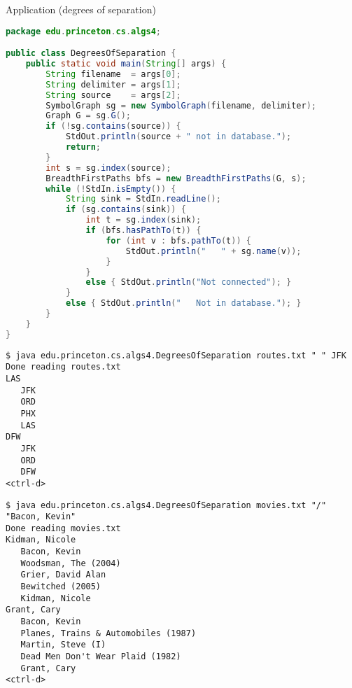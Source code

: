 \documentclass[8pt,a4paper,compress]{beamer}
\begin{document}
\begin{frame}[fragile]
\pause

Application (degrees of separation)
\begin{lstlisting}[language=Java]
package edu.princeton.cs.algs4;

public class DegreesOfSeparation {
    public static void main(String[] args) {
        String filename  = args[0];
        String delimiter = args[1];
        String source    = args[2];
        SymbolGraph sg = new SymbolGraph(filename, delimiter);
        Graph G = sg.G();
        if (!sg.contains(source)) {
            StdOut.println(source + " not in database.");
            return;
        }
        int s = sg.index(source);
        BreadthFirstPaths bfs = new BreadthFirstPaths(G, s);
        while (!StdIn.isEmpty()) {
            String sink = StdIn.readLine();
            if (sg.contains(sink)) {
                int t = sg.index(sink);
                if (bfs.hasPathTo(t)) {
                    for (int v : bfs.pathTo(t)) {
                        StdOut.println("   " + sg.name(v));
                    }
                }
                else { StdOut.println("Not connected"); }
            }
            else { StdOut.println("   Not in database."); }
        }
    }
}
\end{lstlisting}
\end{frame}

\begin{frame}[fragile]
\pause

\begin{lstlisting}[language={}]
$ java edu.princeton.cs.algs4.DegreesOfSeparation routes.txt " " JFK
Done reading routes.txt
LAS
   JFK
   ORD
   PHX
   LAS
DFW
   JFK
   ORD
   DFW
<ctrl-d>
\end{lstlisting}

\pause

\begin{lstlisting}[language={}]
$ java edu.princeton.cs.algs4.DegreesOfSeparation movies.txt "/" "Bacon, Kevin"
Done reading movies.txt
Kidman, Nicole
   Bacon, Kevin
   Woodsman, The (2004)
   Grier, David Alan
   Bewitched (2005)
   Kidman, Nicole
Grant, Cary
   Bacon, Kevin
   Planes, Trains & Automobiles (1987)
   Martin, Steve (I)
   Dead Men Don't Wear Plaid (1982)
   Grant, Cary
<ctrl-d>
\end{lstlisting}
\end{frame}
\end{document}
